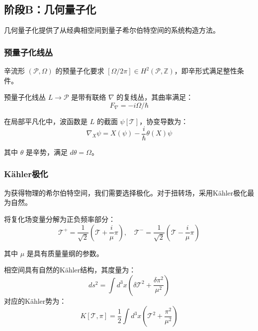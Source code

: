 \subsection{阶段B：几何量子化}
\label{subsec:stageB_geometric}

几何量子化提供了从经典相空间到量子希尔伯特空间的系统构造方法。

\subsubsection{预量子化线丛}

辛流形 $(\mathcal{P}, \Omega)$ 的预量子化要求 $[\Omega/2\pi] \in H^2(\mathcal{P}, \mathbb{Z})$，即辛形式满足整性条件。

\begin{definition}[预量子化线丛]
预量子化线丛 $L \to \mathcal{P}$ 是带有联络 $\nabla$ 的复线丛，其曲率满足：
\begin{equation}
    F_\nabla = -i\Omega/\hbar
\end{equation}
\end{definition}

在局部平凡化中，波函数是 $L$ 的截面 $\psi[\mathcal{T}]$，协变导数为：
\begin{equation}
    \nabla_X \psi = X(\psi) - \frac{i}{\hbar} \theta(X) \psi
\end{equation}

其中 $\theta$ 是辛势，满足 $d\theta = \Omega$。

\subsubsection{Kähler极化}

为获得物理的希尔伯特空间，我们需要选择极化。对于扭转场，采用Kähler极化最为自然。

将复化场变量分解为正负频率部分：
\begin{equation}
    \mathcal{T}^+ = \frac{1}{\sqrt{2}} \left( \mathcal{T} + \frac{i}{\mu} \pi \right), \quad \mathcal{T}^- = \frac{1}{\sqrt{2}} \left( \mathcal{T} - \frac{i}{\mu} \pi \right)
\end{equation}

其中 $\mu$ 是具有质量量纲的参数。

\begin{theorem}[Kähler结构]
相空间具有自然的Kähler结构，其度量为：
\begin{equation}
    ds^2 = \int d^3x \left( \delta\mathcal{T}^2 + \frac{\delta\pi^2}{\mu^2} \right)
\end{equation}
对应的Kähler势为：
\begin{equation}
    K[\mathcal{T}, \pi] = \frac{1}{2} \int d^3x \left( \mathcal{T}^2 + \frac{\pi^2}{\mu^2} \right)
\end{equation}
\end{theorem}

